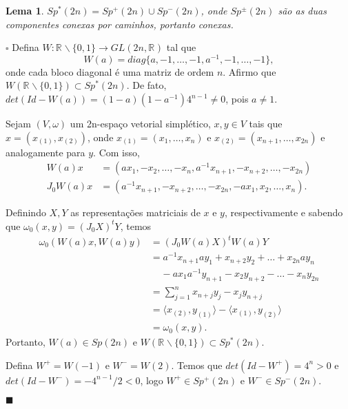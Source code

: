 \documentclass[12pt]{book}
\newtheorem{lema}[teorema]{Lema}
\newenvironment{prova}[1]{$\square$ #1}{\hfill$\blacksquare$}
\newcommand{\complementar}[2]{#1 \backslash #2}
\newcommand{\estruturacomplexa}{J_{0}}
\newcommand{\formaSimpleticaPadrao}[2]{\omega_{0}(#1, #2)}
\newcommand{\generalgroup}[2]{GL(#1, #2)}
\newcommand{\generalgroupreal}[1]{\generalgroup{#1}{\real{}}}
\newcommand{\gruposimpletico}[1]{Sp(#1)}
\newcommand{\gruposimpleticonaodegenerado}[1]{Sp^{#1}(2n)}
\newcommand{\produtointerno}[2]{\langle #1, #2 \rangle}
\newcommand{\real}[1]{\mathbb{R}^{#1}}
\newcommand{\reta}{\real{}}
\begin{document}
	\begin{lema}
		$\gruposimpleticonaodegenerado{*} = \gruposimpleticonaodegenerado{+}\cup \gruposimpleticonaodegenerado{-}$, onde $\gruposimpleticonaodegenerado{\pm}$ são as duas componentes conexas por caminhos, portanto conexas.
	\end{lema}
	\begin{prova}
		Defina $W: \complementar{\reta}{\{0,1\}} \to \generalgroupreal{2n}$ tal que 
		$$
		W(a) = diag\{a, -1, \dots, -1, a^{-1}, -1, \dots , -1\},
		$$
		onde cada bloco diagonal é uma matriz de ordem $n$. Afirmo que $W(\complementar{\reta}{\{0,1\}}) \subset \gruposimpleticonaodegenerado{*}$. De fato, $det(Id - W(a)) = (1-a)(1-a^{-1})4^{n-1} \neq 0$, pois $a\neq 1$.
		
		Sejam $(V, \omega)$ um 2n-espaço vetorial simplético, $x,y \in V$ tais que $x=(x_{(1)}, x_{(2)})$, onde $x_{(1)} = (x_{1}, \dots, x_{n})$ e $x_{(2)} = (x_{n+1}, \dots, x_{2n})$ e analogamente para $y$. Com isso, 
		$$
		\begin{aligned}	
		W(a)x &= (ax_{1}, -x_{2}, \dots, -x_{n}, a^{-1}x_{n+1}, -x_{n+2}, \dots, -x_{2n})
		\\
		\estruturacomplexa W(a)x &= (a^{-1}x_{n+1}, -x_{n+2}, \dots, -x_{2n}, -ax_{1}, x_{2}, \dots, x_{n}).
		\end{aligned}
		$$ 
		
		Definindo $X, Y$ as representações matriciais de $x$ e $y$, respectivamente e sabendo que $\formaSimpleticaPadrao{x}{y} = (\estruturacomplexa X)^{t}Y$, temos
		$$
		\begin{aligned}
		\formaSimpleticaPadrao{W(a)x}{W(a)y} 
		&=
		(\estruturacomplexa W(a)X)^{t}W(a)Y
		\\
		&=a^{-1} x_{n+1}ay_{1} + x_{n+2}y_{2}+ \dots + x_{2n}ay_{n}
		\\
		& \;\;\;\; -ax_{1}a^{-1}y_{n+1}- x_{2}y_{n+2}-\dots - x_{n}y_{2n} 
		\\
		&=\sum_{j=1}^{n}x_{n+j}y_{j} - 	x_{j}y_{n+j}
		\\
		&= \produtointerno{x_{(2)}}{y_{(1)}} - \produtointerno{x_{(1)}}{y_{(2)}}
		\\
		&= \formaSimpleticaPadrao{x}{y}.
		\end{aligned}
		$$
		Portanto, $W(a) \in \gruposimpletico{2n}$ e $W(\complementar{\reta}{\{0,1\}}) \subset \gruposimpleticonaodegenerado{*}$.
		
		Defina $W^{+} = W(-1)$ e $W^{-} = W(2)$. Temos que $det(Id - W^{+}) = 4^{n}>0$  e $det(Id - W^{-}) = -4^{n-1}/2 <0$, logo $W^{+}\in \gruposimpleticonaodegenerado{+}$ e $W^{-}\in \gruposimpleticonaodegenerado{-}$. 
		

\end{prova}
\end{document}
